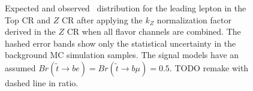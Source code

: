 \begin{figure}
  \centering
  \caption{Expected and observed \pt\ distribution for the leading lepton in
    the Top CR and $Z$ CR after applying the $k_Z$ normalization factor derived
    in the $Z$ CR when all flavor channels are combined.
    The hashed error bands show only the statistical uncertainty in the
    background MC simulation samples.
    The signal models have an assumed
    $Br(\tilde{t}\rightarrow be) = Br(\tilde{t}\rightarrow b\mu) = 0.5$.
    {\color{red} TODO remake with dashed line in ratio.}
  }
  \label{fig:cr_lep_pt_0__w_norm_factor}
\end{figure}

